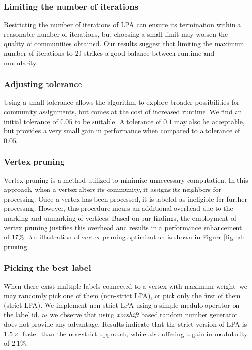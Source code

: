 \subsubsection{Limiting the number of iterations}

Restricting the number of iterations of LPA can ensure its termination within a reasonable number of iterations, but choosing a small limit may worsen the quality of communities obtained. Our results suggest that limiting the maximum number of iterations to $20$ strikes a good balance between runtime and modularity.


\subsubsection{Adjusting tolerance}

Using a small tolerance allows the algorithm to explore broader possibilities for community assignments, but comes at the cost of increased runtime. We find an initial tolerance of $0.05$ to be suitable. A tolerance of $0.1$ may also be acceptable, but provides a very small gain in performance when compared to a tolerance of $0.05$.


\subsubsection{Vertex pruning}

Vertex pruning is a method utilized to minimize unnecessary computation. In this approach, when a vertex alters its community, it assigns its neighbors for processing. Once a vertex has been processed, it is labeled as ineligible for further processing. However, this procedure incurs an additional overhead due to the marking and unmarking of vertices. Based on our findings, the employment of vertex pruning justifies this overhead and results in a performance enhancement of $17\%$. An illustration of vertex pruning optimization is shown in Figure \ref{fig:rak-pruning}.




\subsubsection{Picking the best label}

When there exist multiple labels connected to a vertex with maximum weight, we may randomly pick one of them (non-strict LPA), or pick only the first of them (strict LPA). We implement non-strict LPA using a simple modulo operator on the label id, as we observe that using \textit{xorshift} based random number generator does not provide any advantage. Results indicate that the strict version of LPA is $1.5\times$ faster than the non-strict approach, while also offering a gain in modularity of $2.1\%$.



